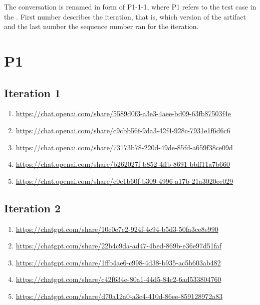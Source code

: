 
The conversation is renamed in form of P1-1-1, where P1 refers to the test case in the \textcite{act_rule_g88}. First number describes the iteration, that is, which version of the artifact and the last number the sequence number ran for the iteration.


\section{P1\label{P1-1}}

\subsection{Iteration 1}

\begin{enumerate}
    \item \href{https://chat.openai.com/share/5589d0f3-a3e3-4aee-bd09-63fb87503f4e}{https://chat.openai.com/share/5589d0f3-a3e3-4aee-bd09-63fb87503f4e}
    \item \href{https://chat.openai.com/share/c9cbb56f-9da3-42f4-928c-7931e1f6d6c6}{https://chat.openai.com/share/c9cbb56f-9da3-42f4-928c-7931e1f6d6c6}
    \item \href{https://chat.openai.com/share/73173b78-220d-49de-85fd-a659f38ce09d}{https://chat.openai.com/share/73173b78-220d-49de-85fd-a659f38ce09d}
    \item \href{https://chat.openai.com/share/b262027f-b852-4ffb-8691-bbff11a7b660}{https://chat.openai.com/share/b262027f-b852-4ffb-8691-bbff11a7b660}
    \item \href{https://chat.openai.com/share/e0c1b60f-b309-4996-a17b-21a3020ee029}{https://chat.openai.com/share/e0c1b60f-b309-4996-a17b-21a3020ee029}
\end{enumerate}

\subsection{Iteration 2}

\begin{enumerate}
    \item \href{https://chatgpt.com/share/10e0e7c2-924f-4c94-b5d3-50fa3ce8e990}{https://chatgpt.com/share/10e0e7c2-924f-4c94-b5d3-50fa3ce8e990}
    \item \href{https://chatgpt.com/share/22b4c9da-ad47-4bed-869b-e36e97d51faf}{https://chatgpt.com/share/22b4c9da-ad47-4bed-869b-e36e97d51faf}
    \item \href{https://chatgpt.com/share/1ffb4ae6-c998-4d38-b935-ac5b603ab482}{https://chatgpt.com/share/1ffb4ae6-c998-4d38-b935-ac5b603ab482}
    \item \href{https://chatgpt.com/share/c42f634e-80a1-44d5-84c2-6ad533804760}{https://chatgpt.com/share/c42f634e-80a1-44d5-84c2-6ad533804760}
    \item \href{https://chatgpt.com/share/d70a12a0-a3c4-410d-86ee-859128972a83}{https://chatgpt.com/share/d70a12a0-a3c4-410d-86ee-859128972a83}
\end{enumerate}

